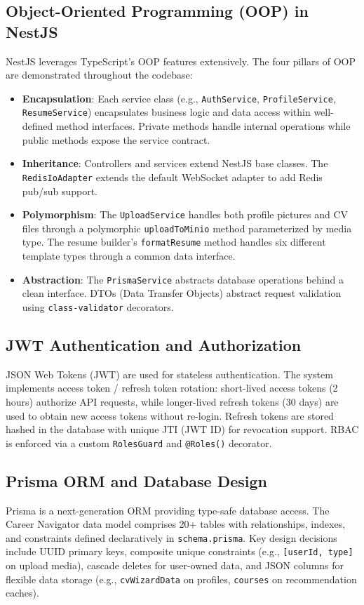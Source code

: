 \documentclass[12pt,a4paper]{report}
\begin{document}
\subsection{Object-Oriented Programming (OOP) in NestJS}
NestJS leverages TypeScript's OOP features extensively. The four pillars of OOP are demonstrated throughout the codebase:
\begin{itemize}
    \item \textbf{Encapsulation}: Each service class (e.g., \texttt{AuthService}, \texttt{ProfileService}, \texttt{ResumeService}) encapsulates business logic and data access within well-defined method interfaces. Private methods handle internal operations while public methods expose the service contract.
    \item \textbf{Inheritance}: Controllers and services extend NestJS base classes. The \texttt{RedisIoAdapter} extends the default WebSocket adapter to add Redis pub/sub support.
    \item \textbf{Polymorphism}: The \texttt{UploadService} handles both profile pictures and CV files through a polymorphic \texttt{uploadToMinio} method parameterized by media type. The resume builder's \texttt{formatResume} method handles six different template types through a common data interface.
    \item \textbf{Abstraction}: The \texttt{PrismaService} abstracts database operations behind a clean interface. DTOs (Data Transfer Objects) abstract request validation using \texttt{class-validator} decorators.
\end{itemize}

\subsection{JWT Authentication and Authorization}
JSON Web Tokens (JWT) are used for stateless authentication. The system implements access token / refresh token rotation: short-lived access tokens (2 hours) authorize API requests, while longer-lived refresh tokens (30 days) are used to obtain new access tokens without re-login. Refresh tokens are stored hashed in the database with unique JTI (JWT ID) for revocation support. RBAC is enforced via a custom \texttt{RolesGuard} and \texttt{@Roles()} decorator.

\subsection{Prisma ORM and Database Design}
Prisma is a next-generation ORM providing type-safe database access. The Career Navigator data model comprises 20+ tables with relationships, indexes, and constraints defined declaratively in \texttt{schema.prisma}. Key design decisions include UUID primary keys, composite unique constraints (e.g., \texttt{[userId, type]} on upload media), cascade deletes for user-owned data, and JSON columns for flexible data storage (e.g., \texttt{cvWizardData} on profiles, \texttt{courses} on recommendation caches).
\end{document}
